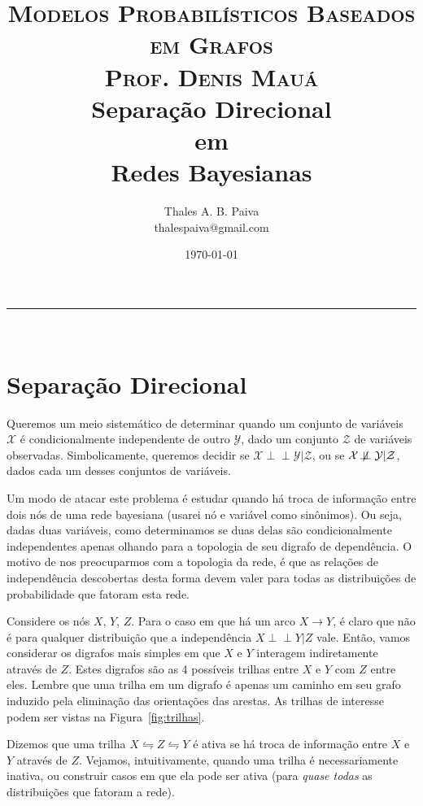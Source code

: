 \documentclass[paper=a4, fontsize=11pt]{scrartcl} %
\title{	
\normalfont \normalsize 
\textsc{Modelos Probabilísticos Baseados em Grafos} \\ 
\textsc{Prof. Denis Mauá} \\ [25pt]
\huge Separação Direcional \\ em \\ Redes Bayesianas\\ [25pt]
}
\author{Thales A. B. Paiva \\ thalespaiva@gmail.com} %
\date{\today} %
\numberwithin{equation}{subsection}
\numberwithin{figure}{subsection}
\numberwithin{table}{subsection}
\numberwithin{definition}{subsection}
\numberwithin{theorem}{subsection}
\numberwithin{property}{subsection}
\numberwithin{proposition}{subsection}
\numberwithin{equation}{section}
\numberwithin{figure}{section}
\numberwithin{table}{section}
\numberwithin{definition}{section}
\numberwithin{theorem}{section}
\numberwithin{property}{section}
\numberwithin{proposition}{section}
\newcommand{\horrule}[1]{\rule{\linewidth}{#1}} %
\newcommand{\set}[1]{\mathcal{#1}}
\def\ind{\perp\!\!\!\perp}
\def\nind{\not\!\perp\!\!\!\perp}
\begin{document}
\maketitle %
\horrule{1pt} \\[0.5cm] %

\tableofcontents

\pagebreak
\section{Separação Direcional}
\FloatBarrier

Queremos um meio sistemático de determinar quando um conjunto de variáveis $\set{X}$ é condicionalmente independente de outro $\set{Y}$, dado um conjunto $\set{Z}$ de variáveis observadas. Simbolicamente, queremos decidir se $ \set{X} \ind \set{Y} | \set{Z}$, ou se $ \set{X} \nind \set{Y} | \set{Z}$, dados cada um desses conjuntos de variáveis. 

Um modo de atacar este problema é estudar quando há troca de informação entre dois nós de uma rede bayesiana (usarei nó e variável como sinônimos). Ou seja, dadas duas variáveis, como determinamos se duas delas são condicionalmente independentes apenas olhando para a topologia de seu digrafo de dependência. O motivo de nos preocuparmos com a topologia da rede, é que as relações de independência descobertas desta forma devem valer para todas as distribuições de probabilidade que fatoram esta rede.

Considere os nós $X$, $Y$, $Z$. Para o caso em que há um arco $X \rightarrow Y$, é claro que não é para qualquer distribuição que a independência $X \ind Y | Z$ vale. Então, vamos considerar os digrafos mais simples em que $X$ e $Y$ interagem indiretamente através de $Z$. Estes digrafos são as 4 possíveis trilhas entre $X$ e $Y$ com $Z$ entre eles. Lembre que uma trilha em um digrafo é apenas um caminho em seu grafo induzido pela eliminação das orientações das arestas. As trilhas de interesse podem ser vistas na Figura~\ref{fig:trilhas}.

Dizemos que uma trilha $X \leftrightharpoons Z \leftrightharpoons Y$ é ativa se há troca de informação entre $X$ e $Y$ através de $Z$. Vejamos, intuitivamente, quando uma trilha é necessariamente inativa, ou construir casos em que ela pode ser ativa (para \emph{quase todas} as distribuições que fatoram a rede).
\end{document}
